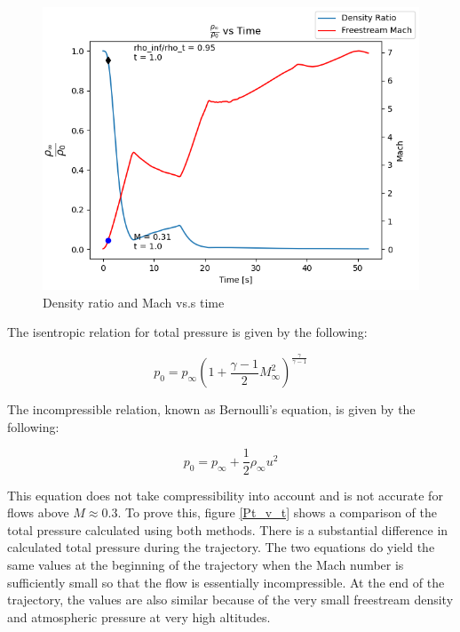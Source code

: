 \documentclass[../main.tex]{subfiles}
\begin{document}
\begin{figure}[h!]
    \centering
    \includegraphics[scale=.7]{../../images/problem_1/rho_rho_t_and_Mach_vs_Time_marked.png}
    \caption{Density ratio and Mach vs.s time}
    \label{rho_rho_t_vs_Mach_marked}
\end{figure}

The isentropic relation for total pressure is given by the following:

\[
    p_0 = p_\infty {\left({1 + \frac{\gamma-1}{2}M_\infty^2}\right)}^{\frac{\gamma}{\gamma-1}}  
\]

The incompressible relation, known as Bernoulli's equation, is given by the following:

\[
    p_0 = p_\infty + \frac{1}{2} \rho_\infty u^2
\]

This equation does not take compressibility into account and is not accurate for flows above \(M \approx 0.3\).
To prove this, figure \ref{Pt_v_t} shows a comparison of the total pressure calculated using both methods. 
There is a substantial difference in calculated total pressure during the trajectory.
The two equations do yield the same values at the beginning of the trajectory when the Mach number is sufficiently small so that the flow is essentially incompressible.
At the end of the trajectory, the values are also similar because of the very small freestream density and atmospheric pressure at very high altitudes.
\end{document}

